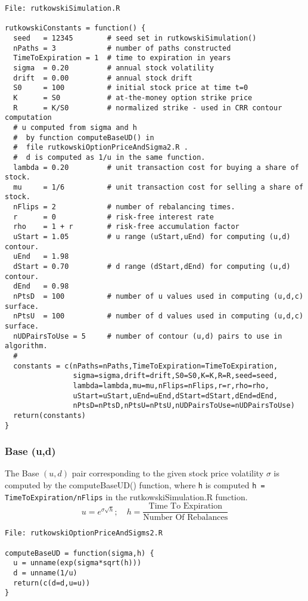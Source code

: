 \documentclass[10pt]{article}
\begin{document}
\begin{verbatim}
File: rutkowskiSimulation.R

rutkowskiConstants = function() {
  seed   = 12345        # seed set in rutkowskiSimulation()
  nPaths = 3            # number of paths constructed
  TimeToExpiration = 1  # time to expiration in years
  sigma  = 0.20         # annual stock volatility
  drift  = 0.00         # annual stock drift
  S0     = 100          # initial stock price at time t=0
  K      = S0           # at-the-money option strike price
  R      = K/S0         # normalized strike - used in CRR contour computation
  # u computed from sigma and h
  #  by function computeBaseUD() in
  #  file rutkowskiOptionPriceAndSigma2.R .
  #  d is computed as 1/u in the same function.
  lambda = 0.20         # unit transaction cost for buying a share of stock.
  mu     = 1/6          # unit transaction cost for selling a share of stock.
  nFlips = 2            # number of rebalancing times.
  r      = 0            # risk-free interest rate
  rho    = 1 + r        # risk-free accumulation factor
  uStart = 1.05         # u range (uStart,uEnd) for computing (u,d) contour.
  uEnd   = 1.98
  dStart = 0.70         # d range (dStart,dEnd) for computing (u,d) contour.
  dEnd   = 0.98
  nPtsD  = 100          # number of u values used in computing (u,d,c) surface.
  nPtsU  = 100          # number of d values used in computing (u,d,c) surface.
  nUDPairsToUse = 5     # number of contour (u,d) pairs to use in algorithm.
  #
  constants = c(nPaths=nPaths,TimeToExpiration=TimeToExpiration,
                sigma=sigma,drift=drift,S0=S0,K=K,R=R,seed=seed,
                lambda=lambda,mu=mu,nFlips=nFlips,r=r,rho=rho,
                uStart=uStart,uEnd=uEnd,dStart=dStart,dEnd=dEnd,
                nPtsD=nPtsD,nPtsU=nPtsU,nUDPairsToUse=nUDPairsToUse)
  return(constants)
}
\end{verbatim}

\subsubsection*{Base (u,d)}

The Base $(u,d)$ pair corresponding to the given stock price volatility $\sigma$
is computed by the computeBaseUD() function,
 where \verb!h! is computed \verb!h = TimeToExpiration/nFlips! in the rutkowskiSimulation.R function.
\[
u = e^{\sigma \sqrt{h}};\quad h = \frac{\text{Time To Expiration}}{\text{Number Of Rebalances}}
\]

\begin{verbatim}
File: rutkowskiOptionPriceAndSigms2.R

computeBaseUD = function(sigma,h) {
  u = unname(exp(sigma*sqrt(h)))
  d = unname(1/u)
  return(c(d=d,u=u))
}
\end{verbatim}
\end{document}

